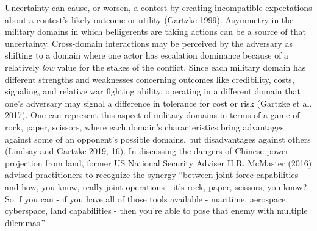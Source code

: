 \documentclass[
]{article}
\begin{document}
Uncertainty can cause, or worsen, a contest by creating incompatible expectations about a contest's likely outcome or utility (Gartzke 1999). Asymmetry in the military domains in which belligerents are taking actions can be a source of that uncertainty. Cross-domain interactions may be perceived by the adversary as shifting to a domain where one actor has escalation dominance because of a relatively \textit{low} value for the stakes of the conflict. Since each military domain has different strengths and weaknesses concerning outcomes like credibility, costs, signaling, and relative war fighting ability, operating in a different domain that one's adversary may signal a difference in tolerance for cost or risk (Gartzke et al. 2017). One can represent this aspect of military domains in terms of a game of rock, paper, scissors, where each domain's characteristics bring advantages against some of an opponent's possible domains, but disadvantages against others (Lindsay and Gartzke 2019, 16). In discussing the dangers of Chinese power projection from land, former US National Security Adviser H.R. McMaster (2016) advised practitioners to recognize the synergy ``between joint force capabilities and how, you know, really joint operations - it's rock, paper, scissors, you know? So if you can - if you have all of those tools available - maritime, aerospace, cyberspace, land capabilities - then you're able to pose that enemy with multiple dilemmas.''
\end{document}
